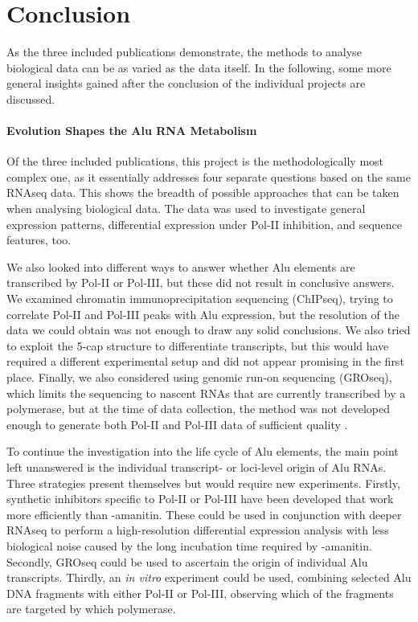
\chapter{Conclusion}

As the three included publications demonstrate, the methods to analyse
biological data can be as varied as the data itself. In the following, some
more general insights gained after the conclusion of the individual projects
are discussed.

\subsubsection{Evolution Shapes the Alu RNA Metabolism}
\label{subsubsec:alus}
Of the three included publications, this project is the methodologically most
complex one, as it essentially addresses four separate questions based on the
same RNAseq data. This shows the breadth of possible approaches that can be
taken when analysing biological data. The data was used to investigate general
expression patterns, differential expression under Pol-II inhibition, and
sequence features, too.

We also looked into different ways to answer whether Alu elements are
transcribed by Pol-II or Pol-III, but these did not result in conclusive
answers. We examined chromatin immunoprecipitation sequencing (ChIPseq),
trying to correlate Pol-II and Pol-III peaks with Alu expression, but the
resolution of the data we could obtain was not enough to draw any solid
conclusions. We also tried to exploit the 5\textquotesingle-cap structure to
differentiate transcripts, but this would have required a different
experimental setup and did not appear promising in the first place. Finally,
we also considered using genomic run-on sequencing (GROseq), which limits the
sequencing to nascent RNAs that are currently transcribed by a polymerase, but
at the time of data collection, the method was not developed enough to
generate both Pol-II and Pol-III data of sufficient quality \citep{Gardini2017}.

To continue the investigation into the life cycle of Alu elements, the main
point left unanswered is the individual transcript- or loci-level origin of
Alu RNAs. Three strategies present themselves but would require new
experiments. Firstly, synthetic inhibitors specific to Pol-II or Pol-III have
been developed that work more efficiently than \textalpha-amanitin. These
could be used in conjunction with deeper RNAseq to perform a high-resolution
differential expression analysis with less biological noise caused by the long
incubation time required by \textalpha-amanitin. Secondly, GROseq could be
used to ascertain the origin of individual Alu transcripts. Thirdly, an
\textit{in vitro} experiment could be used, combining selected Alu DNA
fragments with either Pol-II or Pol-III, observing which of the fragments are
targeted by which polymerase.

